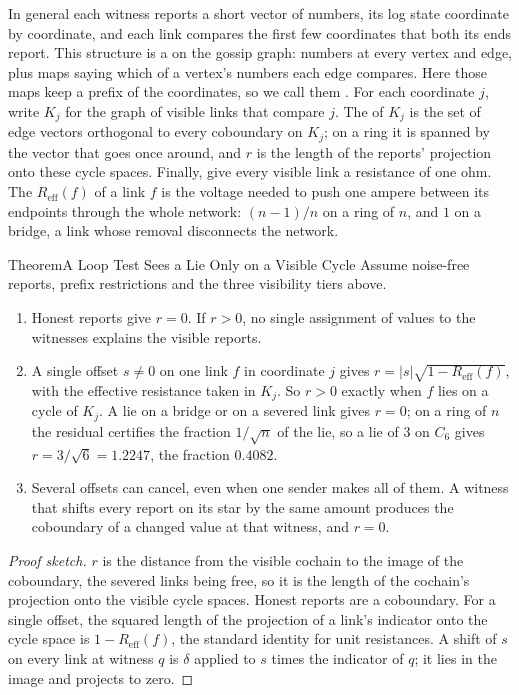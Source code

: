 \documentclass[11pt,a4paper]{article}
\theoremstyle{definition}
\theoremstyle{remark}
\begin{document}
In general each witness reports a short vector of numbers, its log state
coordinate by coordinate, and each link compares the first few coordinates
that both its ends report. This structure is a  on the
gossip graph: numbers at every vertex and edge, plus maps saying which of a
vertex's numbers each edge compares. Here those maps keep a prefix of the
coordinates, so we call them . For each coordinate
$j$, write $K_j$ for the graph of visible links that compare $j$. The
 of $K_j$ is the set of edge vectors orthogonal to every
coboundary on $K_j$; on a ring it is spanned by the vector that goes once
around, and $r$ is the length of the reports' projection onto these cycle
spaces. Finally, give every visible link a resistance of one ohm. The
 $R_{\mathrm{eff}}(f)$ of a link $f$ is the
voltage needed to push one ampere between its endpoints through the whole
network: $(n-1)/n$ on a ring of $n$, and $1$ on a bridge, a link whose removal
disconnects the network.

\begin{pdclaim}{Theorem}{A Loop Test Sees a Lie Only on a Visible Cycle}
\setlength{\parskip}{4pt plus 1pt}
\label{thm:sheaf-equivocation}
Assume noise-free reports, prefix restrictions and the three visibility tiers above.
\begin{enumerate}[nosep]
\item Honest reports give $r=0$. If $r>0$, no single assignment of values to the witnesses explains the visible reports.
\item A single offset $s\neq0$ on one link $f$ in coordinate $j$ gives
$r=|s|\sqrt{1-R_{\mathrm{eff}}(f)}$, with the effective resistance taken in
$K_j$. So $r>0$ exactly when $f$ lies on a cycle of $K_j$. A lie on a bridge
or on a severed link gives $r=0$; on a ring of $n$ the residual certifies the
fraction $1/\sqrt n$ of the lie, so a lie of $3$ on $C_6$ gives
$r=3/\sqrt6=1.2247$, the fraction $0.4082$.
\item Several offsets can cancel, even when one sender makes all of them. A
witness that shifts every report on its star by the same amount produces the
coboundary of a changed value at that witness, and $r=0$.
\end{enumerate}
\end{pdclaim}
\begin{proof}[Proof sketch]
\setlength{\parskip}{4pt plus 1pt}
$r$ is the distance from the visible cochain to the image of the coboundary,
the severed links being free, so it is the length of the cochain's projection
onto the visible cycle spaces. Honest reports are a coboundary. For a single
offset, the squared length of the projection of a link's indicator onto the
cycle space is $1-R_{\mathrm{eff}}(f)$, the standard identity for unit
resistances. A shift of $s$ on every link at witness $q$ is $\delta$ applied
to $s$ times the indicator of $q$; it lies in the image and projects to zero.
\end{proof}
\end{document}
